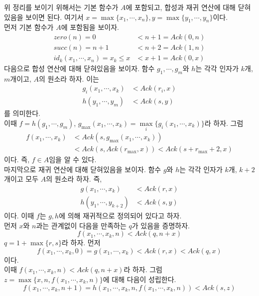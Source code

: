 \documentclass[b5paper, 10pt]{book}
\theoremstyle{definition}
\newenvironment{pf*}{\pushQED{\qed}\pf}{\popQED\endpf}
\begin{document}
\begin{pf*}
    위 정리를 보이기 위해서는 기본 함수가 $A$에 포함되고, 합성과 재귀 연산에 대해 닫혀있음을 보이면 된다. 
    여기서 $x = \max \{x_1, \cdots, x_n\}, y = \max\{y_1, \cdots, y_n\}$이다. \\ 
    먼저 기본 함수가 $A$에 포함됨을 보이자.  
    \begin{align*}
        zero(n) = 0 &< n+1 = Ack(0,n) \\ 
        succ(n) = n+1 &<n+2 = Ack(1,n) \\ 
        id_k(x_1, \cdots, x_n) = x_k \le x &< x+1 = Ack(0,x) 
    \end{align*} 
    다음으로 합성 연산에 대해 닫혀있음을 보이자. 함수 $g_1, \cdots, g_m$와 $h$는 각각 인자가 $k$개, $m$개이고, 
    $A$의 원소라 하자. 이는 
    \begin{align*}
        g_i(x_1, \cdots, x_k) &< Ack(r_i, x) \\ 
        h(y_1, \cdots, y_m) &< Ack(s,y)
    \end{align*}
    를 의미한다. \\ 
    이때 $f = h(g_1, \cdots, g_m)$, $ g_{\max} (x_1,\cdots, x_k) =\underset{i}{\max} \{g_i(x_1, \cdots, x_k)\}$라 하자. 
    그럼 
    \begin{align*}
        f(x_1, \cdots, x_k) &< Ack(s, g_{\max}(x_1, \cdots, x_k)) \\ 
        &< Ack(s, Ack(r_{\max},x)) < Ack(s+r_{\max}+2,x)
    \end{align*}
    이다. 
    즉, $f \in A$임을 알 수 있다. \\ 
    마지막으로 재귀 연산에 대해 닫혀있음을 보이자. 함수 $g$와 $h$는 각각 인자가 $k$개, $k+2$개이고 모두 $A$의 원소라 
    하자. 즉, 
    \begin{align*}
        g(x_1, \cdots, x_k) &< Ack(r, x) \\ 
        h(y_1,\cdots, y_{k+2}) &< Ack(s,y)
    \end{align*}
    이다. 이때
    $f$는 $g,h$에 의해 재귀적으로 정의되어 있다고 하자.\\ 
    먼저 $x$와 $n$과는 관계없이 다음을 만족하는 $q$가 있음을 증명하자. 
    $$f(x_1, \cdots, x_k, n) < Ack(q, n+x)$$
    $q= 1 + \max \{r,s\}$라 하자. 
    먼저 
    $$f(x_1, \cdots, x_k, 0) = g(x_1, \cdots, x_k) < Ack(r,x) <Ack(q,x)$$
    이다.\\
    이때 $f(x_1, \cdots,x_k, n) < Ack(q, n+x)$라 하자.  
    그럼 $z = \max\{x,n,f(x_1, \cdots, x_k, n)\}$에 대해 다음이
    성립한다.
    $$f(x_1, \cdots, x_k, n+1) = h(x_1, \cdots, x_k, n, f(x_1,\cdots, x_k ,n)) < Ack(s, z)$$

\end{pf*}
\end{document}
